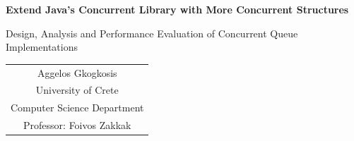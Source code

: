 \documentclass[11pt,onecolumn]{article}
\newcommand{\papertitle}{Extend Java's Concurrent Library with More Concurrent Structures}
\newcommand{\papersubtitle}{Design, Analysis and Performance Evaluation of Concurrent Queue Implementations}
\newcommand{\paperauthor}{Aggelos Gkogkosis}
\newcommand{\paperuniversity}{University of Crete}
\newcommand{\paperdepartment}{Computer Science Department}
\newcommand{\paperprofessor}{Foivos Zakkak}
\begin{document}
{\centering
  {\huge\bfseries \papertitle\par}
  \vspace{0.24cm}
  {\Large \papersubtitle\par}
  \vspace{0.3cm}
  {\normalsize
  \begin{tabular}{c}
    \paperauthor \\
    \paperuniversity \\
    \paperdepartment \\
    Professor: \paperprofessor
  \end{tabular}\par}
}

\vspace{0.2cm}







\end{document}
